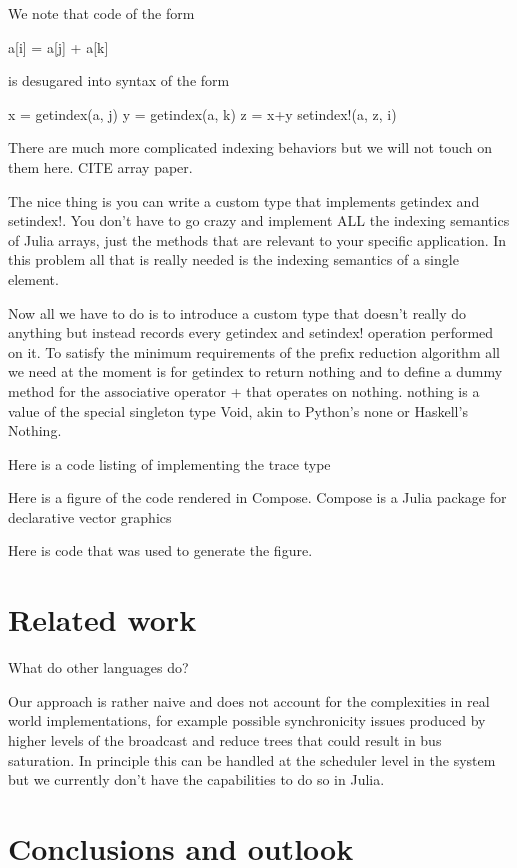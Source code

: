 \documentclass{sig-alternate}
\begin{document}
We note that code of the form

a[i] = a[j] + a[k]

is desugared into syntax of the form

x = getindex(a, j)
y = getindex(a, k)
z = x+y
setindex!(a, z, i)

There are much more complicated indexing behaviors but we will not touch on them here. CITE array paper.

The nice thing is you can write a custom type that implements getindex and setindex!. You don't have to go crazy and implement ALL the indexing semantics of Julia arrays, just the methods that are relevant to your specific application. In this problem all that is really needed is the indexing semantics of a single element.

Now all we have to do is to introduce a custom type that doesn't really do anything but instead records every getindex and setindex! operation performed on it. To satisfy the minimum requirements of the prefix reduction algorithm all we need at the moment is for getindex to return nothing and to define a dummy method for the associative operator + that operates on nothing. nothing is a value of the special singleton type Void, akin to Python's none or Haskell's Nothing.

Here is a code listing of implementing the trace type

Here is a figure of the code rendered in Compose. Compose is a Julia package for declarative vector graphics 

Here is code that was used to generate the figure.

\section{Related work}

What do other languages do?

Our approach is rather naive and does not account for the complexities in real world implementations, for example possible synchronicity issues produced by higher levels of the broadcast and reduce trees that could result in bus saturation. In principle this can be handled at the scheduler level in the system but we currently don't have the capabilities to do so in Julia.

\section{Conclusions and outlook}
\end{document}

